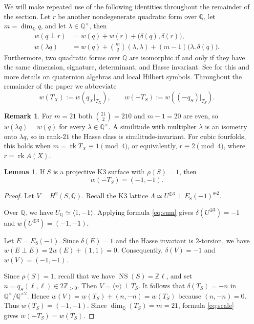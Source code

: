 \documentclass[10pt]{amsart}
\numberwithin{equation}{section}
\theoremstyle{definition}
\newtheorem{lemma}[theorem]{Lemma}
\newtheorem{remark}[theorem]{Remark}
\theoremstyle{plain}
\numberwithin{theorem}{section}
\def\QQ{{\mathbb{Q}}}
\newcommand{\Q}{\mathbb{Q}}
\newcommand{\Z}{\mathbb{Z}}
\newcommand{\NS}{\operatorname{NS}}
\begin{document}
We will make repeated use of the following identities throughout the remainder of the section. Let $r$ be another nondegenerate quadratic form over $\Q$, let $m=\dim_{\Q}q$, and let $\lambda\in\QQ^\times$, then
\begin{align}
w(q\perp r)
&=w(q)+w(r)+\bigl(\delta(q),\delta(r)\bigr),
\label{eq:sum}\\
w(\lambda q)
&=w(q)+\binom{m}{2}(\lambda,\lambda)
+(m-1)\bigl(\lambda,\delta(q)\bigr).
\label{eq:scale}\end{align} 
Furthermore, two quadratic forms over $\Q$ are isomorphic if and only if they have the same dimension, signature, determinant, and Hasse invariant. See
\cite[Chapter~III]{Se} for this and more details on quaternion algebras and local Hilbert symbols.  Throughout the remainder of the paper we abbreviate
\[
w(T_X):=w(q_X\vert_{T_X}),
\qquad
w(-T_S):=w((-q_S)\vert_{T_S}).
\]

\begin{remark}\label{rem:rank}
For $m=21$ both $\binom{21}{2}=210$ and $m-1=20$ are even, so $w(\lambda q)=w(q)$ for every $\lambda\in\Q^{\times}$. A similitude with multiplier $\lambda$ is an isometry onto $\lambda q$, so in rank-$21$ the Hasse class is similitude-invariant. For cubic fourfolds, this holds when $m=\operatorname{rk} T_X \equiv 1 \pmod 4$, or equivalently, $r\equiv 2 \pmod 4$, where $r=\operatorname{rk}A(X)$.
\end{remark}


\begin{lemma}\label{lem:k3-hasse}
If $S$ is a projective K3 surface with $\rho(S)=1$, then
\begin{equation*}
w(-T_S)=(-1,-1).
\end{equation*}
\end{lemma}

\begin{proof}
Let $V=H^2(S,\Q)$. Recall the K3 lattice $\Lambda\simeq U^{\oplus3}\perp E_8(-1)^{\oplus2}$. 

Over $\Q$, we have $U_{\Q}\simeq\langle1,-1\rangle$. Applying formula \eqref{eq:sum} gives $\delta(U^{\oplus3})=-1$ and $w(U^{\oplus3})=(-1,-1)$. 

Let $E=E_8(-1)$. Since $\delta(E)=1$ and the Hasse invariant is
$2$-torsion, we have $w(E\perp E)=2w(E)+(1,1)=0$. Consequently, $\delta(V)=-1$ and $w(V)=(-1,-1)$.

Since $\rho(S)=1$, recall that we have $\NS(S)=\Z\ell$, and set $n=q_S(\ell,\ell)\in2\Z_{>0}$. Then $V=\langle n\rangle\perp T_S$. 
It follows that $\delta(T_S)=-n$ in $\Q^\times/\Q^{\times2}$. Hence $w(V)=w(T_S)+(n,-n)=w(T_S)$ because $(n,-n)=0$. Thus $w(T_S)=(-1,-1)$. Since $\operatorname{dim}_\Q(T_S)=m=21$, formula \eqref{eq:scale} gives $w(-T_S)=w(T_S)$. 
\end{proof}
\end{document}
